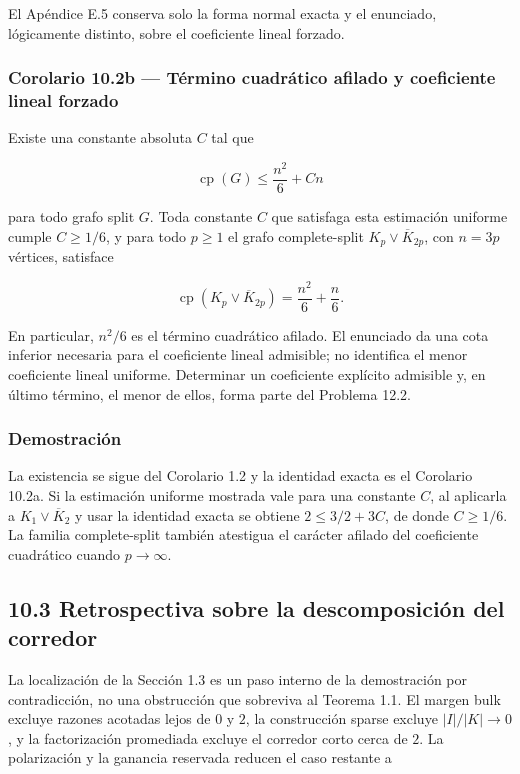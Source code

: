 \documentclass[spanish,11pt,a4paper]{article}
\begin{document}
El Apéndice E.5 conserva solo la forma normal exacta y el enunciado,
lógicamente distinto, sobre el coeficiente lineal forzado.

\subsubsection{Corolario 10.2b --- Término cuadrático afilado y
coeficiente lineal
forzado}\label{corolario-10.2b-tuxe9rmino-cuadruxe1tico-afilado-y-coeficiente-lineal-forzado}

Existe una constante absoluta \(C\) tal que

\[
\operatorname{cp}(G)\le \frac{n^2}{6}+Cn
\]

para todo grafo split \(G\). Toda constante \(C\) que satisfaga esta
estimación uniforme cumple \(C\ge1/6\), y para todo \(p\ge1\) el grafo
complete-split \(K_p\vee\overline K_{2p}\), con \(n=3p\) vértices,
satisface

\[
\operatorname{cp}\!\left(K_p\vee\overline K_{2p}\right)
=\frac{n^2}{6}+\frac n6.
\]

En particular, \(n^2/6\) es el término cuadrático afilado. El enunciado
da una cota inferior necesaria para el coeficiente lineal admisible; no
identifica el menor coeficiente lineal uniforme. Determinar un
coeficiente explícito admisible y, en último término, el menor de ellos,
forma parte del Problema 12.2.

\subsubsection{Demostración}\label{demostraciuxf3n-7}

La existencia se sigue del Corolario 1.2 y la identidad exacta es el
Corolario 10.2a. Si la estimación uniforme mostrada vale para una
constante \(C\), al aplicarla a \(K_1\vee\overline K_2\) y usar la
identidad exacta se obtiene \(2\le3/2+3C\), de donde \(C\ge1/6\). La
familia complete-split también atestigua el carácter afilado del
coeficiente cuadrático cuando \(p\to\infty\).

\subsection{10.3 Retrospectiva sobre la descomposición del
corredor}\label{retrospectiva-sobre-la-descomposiciuxf3n-del-corredor}

La localización de la Sección 1.3 es un paso interno de la demostración
por contradicción, no una obstrucción que sobreviva al Teorema 1.1. El
margen bulk excluye razones acotadas lejos de \(0\) y \(2\), la
construcción sparse excluye \(|I|/|K|\to0\), y la factorización
promediada excluye el corredor corto cerca de \(2\). La polarización y
la ganancia reservada reducen el caso restante a
\end{document}
